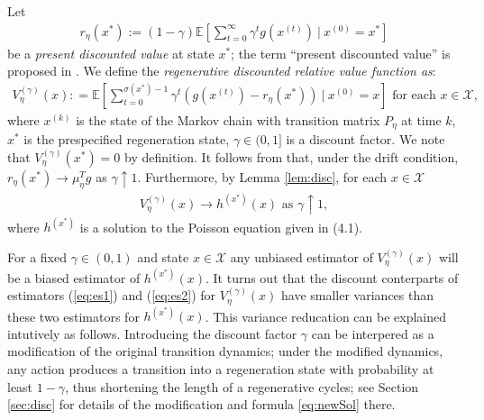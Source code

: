 \documentclass[11pt]{article}
\newcommand{\E}{\mathbb{E}}
\newcommand{\X}{\mathcal{X}}
\newcommand{\V}{\mathcal{V}}
\theoremstyle{definition}
\numberwithin{equation}{section}
\begin{document}
Let
\begin{align}\label{eq:r}
r_\eta(x^*):= (1-\gamma)\E \left[\sum\limits_{t=0}^\infty \gamma^t g(x^{(t)}) ~|~x^{(0)}=x^*\right]
\end{align}
be a \textit{present discounted value} at state $x^*$; the term
``present discounted value'' is proposed in \cite[Section
11.2]{Wagner1975}. We define the \textit{regenerative
  discounted relative value function as}:
\begin{align}\label{eq:Vreg}
V_{\eta}^{(\gamma)}(x): = \E \left[ \sum\limits_{t=0}^{\sigma(x^*)-1} \gamma^{t}  \left(g(x^{(t)}) -  r_\eta(x^*) \right) ~\Big| ~x^{(0)} = x\right] \text{ for each }x\in \X,
\end{align}
where $x^{(k)}$ is the state of the Markov chain with transition matrix
$P_\eta$ at time $k$, $x^*$ is the prespecified regeneration
state, $\gamma\in (0,1]$ is a discount factor.  We note that
$V_{\eta}^{(\gamma)}(x^*) = 0$ by definition.  It follows from
  \cite[Corollary 8.2.5.]{Puterman2005} that, under the drift condition,
  $r_\eta(x^*)\to \mu_\eta^T g$ as $\gamma\uparrow 1$.  Furthermore, by
  Lemma \ref{lem:disc}, for each $x\in \X$
  \begin{align*}
   V_{\eta}^{(\gamma)}(x) \to h^{(x^*)}(x)  \text{ as } \gamma\uparrow 1,
  \end{align*}
  where $h^{(x^*)}$ is a solution to the Poisson equation given in (4.1).


For a fixed  $\gamma\in (0,1)$ and state $x\in \X$  any unbiased
  estimator of $V_{\eta}^{(\gamma)}(x)$ will be a biased estimator of
  $h^{(x^*)}(x)$. It turns out that the discount conterparts of
  estimators (\ref{eq:es1}) and (\ref{eq:es2}) for
  $V_{\eta}^{(\gamma)}(x)$ have smaller variances than these two estimators for $h^{(x^*)}(x)$. This variance
  reducation can be explained intutively as follows.  Introducing the
discount factor $\gamma$ can be interpered as a modification of the
original transition dynamics; under the modified dynamics, any action
produces a transition into a regeneration state with probability at
least $1 - \gamma$, thus shortening the length of a regenerative
cycles; see Section \ref{sec:disc} for details of the modification  and formula \ref{eq:newSol} there.
\end{document}
